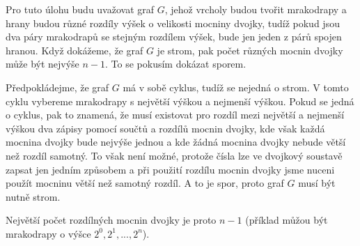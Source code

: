 \documentclass{fkssolpub}
\author{Ondřej Sedláček}
\begin{document}
Pro tuto úlohu budu uvažovat graf $G$, jehož vrcholy budou tvořit mrakodrapy
a hrany budou různé rozdíly výšek o velikosti mocniny dvojky, tudíž pokud jsou
dva páry mrakodrapů se stejným rozdílem výšek, bude jen jeden z párů spojen
hranou. Když dokážeme, že graf $G$ je strom, pak počet různých mocnin dvojky
může být nejvýše $n - 1$. To se pokusím dokázat sporem.

Předpokládejme, že graf $G$ má v sobě cyklus, tudíž se nejedná o strom. V
tomto cyklu vybereme mrakodrapy s největší výškou a nejmenší výškou. Pokud
se jedná o cyklus, pak to znamená, že musí existovat pro rozdíl mezi
největší a nejmenší výškou dva zápisy pomocí součtů a rozdílů mocnin dvojky,
kde však každá mocnina dvojky bude nejvýše jednou a kde žádná mocnina dvojky
nebude větší než rozdíl samotný. To však není možné, protože čísla lze ve
dvojkový soustavě zapsat jen jedním způsobem a při použití rozdílu mocnin
dvojky jsme nuceni použít mocninu větší než samotný rozdíl. A to je spor,
proto graf $G$ musí být nutně strom.

Největší počet rozdílných mocnin dvojky je proto $n - 1$ (příklad můžou být
mrakodrapy o výšce $2^0, 2^1, ..., 2^n$).
\end{document}

